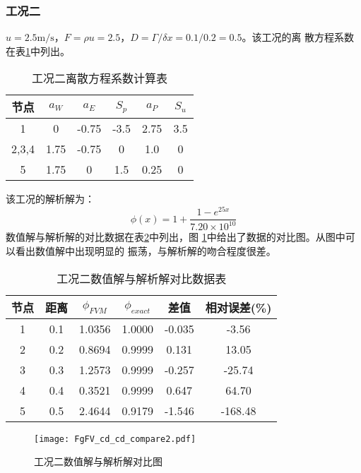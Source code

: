 \subsubsection{工况二}
$u=2.5\mathrm{m/s}$，$F=\rho u=2.5$，$D=\Gamma/\delta x=0.1/0.2=0.5$。该工况的离
散方程系数在表\ref{TbFV_cd_cd_coeff_value2}中列出。
\begin{table}[H]
  \begin{center}
  \caption{工况二离散方程系数计算表}
  \label{TbFV_cd_cd_coeff_value2}
  \begin{tabular}{|c|c|c|c|c|c|}
    \hline
    节点 & $a_{W}$ & $a_{E}$ & $S_{p}$ & $a_{P}$ & $S_{u}$ \\
    \hline
    1 & 0 & -0.75 & -3.5 &   2.75   &  3.5\\
    \hline
    2,3,4 & 1.75 & -0.75 & 0 & 1.0 & 0 \\
    \hline
    5 & 1.75 & 0 & 1.5 & 0.25 &  0 \\
    \hline
  \end{tabular}
  \end{center}
\end{table}
该工况的解析解为：
\begin{equation}
  \phi(x) 
  =
  1 + \frac{1-e^{25x}}{7.20\times 10^{10}}
\end{equation}
数值解与解析解的对比数据在表\ref{TbFV_cd_cd_compare2}中列出，图
\ref{FgFV_cd_cd_compare2}中给出了数据的对比图。从图中可以看出数值解中出现明显的
振荡，与解析解的吻合程度很差。
\begin{table}[H]
  \begin{center}
    \caption{工况二数值解与解析解对比数据表}
  \label{TbFV_cd_cd_compare2}
  \begin{tabular}{|c|c|c|c|c|c|}
    \hline
    节点 & 距离 & $\phi_{FVM}$ & $\phi_{exact}$ & 差值 & 相对误差(\%) \\
    \hline
    1 & 0.1 & 1.0356 & 1.0000 & -0.035  & -3.56 \\
    2 & 0.2 & 0.8694 & 0.9999 & 0.131  & 13.05 \\
    3 & 0.3 & 1.2573 & 0.9999 & -0.257  & -25.74 \\
    4 & 0.4 & 0.3521 & 0.9999 & 0.647  & 64.70 \\
    5 & 0.5 & 2.4644 & 0.9179 & -1.546  & -168.48 \\
    \hline
  \end{tabular}
  \end{center}
\end{table}

\begin{figure}[h]
  \centering
  \texttt{[image: FgFV\_cd\_cd\_compare2.pdf]}
  \caption{工况二数值解与解析解对比图}
  \label{FgFV_cd_cd_compare2}
\end{figure}


